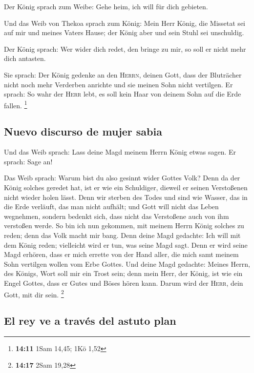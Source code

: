  Der König sprach zum Weibe: Gehe heim, ich will für dich
gebieten.

 Und das Weib von Thekoa sprach zum König: Mein Herr
König, die Missetat sei auf mir und meines Vaters Hause; der König aber
und sein Stuhl sei unschuldig.

 Der König sprach: Wer wider dich redet, den bringe zu
mir, so soll er nicht mehr dich antasten.

 Sie sprach: Der König gedenke an den \textsc{Herrn},
deinen Gott, dass der Bluträcher nicht noch mehr Verderben anrichte und
sie meinen Sohn nicht vertilgen. Er sprach: So wahr der \textsc{Herr}
lebt, es soll kein Haar von deinem Sohn auf die Erde fallen. \footnote{\textbf{14:11}
  1Sam 14,45; 1Kö 1,52}

\hypertarget{nuevo-discurso-de-mujer-sabia}{%
\subsection{Nuevo discurso de mujer
sabia}\label{nuevo-discurso-de-mujer-sabia}}

 Und das Weib sprach: Lass deine Magd meinem Herrn König
etwas sagen. Er sprach: Sage an!

 Das Weib sprach: Warum bist du also gesinnt wider Gottes
Volk? Denn da der König solches geredet hat, ist er wie ein Schuldiger,
dieweil er seinen Verstoßenen nicht wieder holen lässt. 
Denn wir sterben des Todes und sind wie Wasser, das in die Erde
verläuft, das man nicht aufhält; und Gott will nicht das Leben
wegnehmen, sondern bedenkt sich, dass nicht das Verstoßene auch von ihm
verstoßen werde.  So bin ich nun gekommen, mit meinem
Herrn König solches zu reden; denn das Volk macht mir bang. Denn deine
Magd gedachte: Ich will mit dem König reden; vielleicht wird er tun, was
seine Magd sagt.  Denn er wird seine Magd erhören, dass
er mich errette von der Hand aller, die mich samt meinem Sohn vertilgen
wollen vom Erbe Gottes.  Und deine Magd gedachte: Meines
Herrn, des Königs, Wort soll mir ein Trost sein; denn mein Herr, der
König, ist wie ein Engel Gottes, dass er Gutes und Böses hören kann.
Darum wird der \textsc{Herr}, dein Gott, mit dir sein. \footnote{\textbf{14:17}
  2Sam 19,28}

\hypertarget{el-rey-ve-a-travuxe9s-del-astuto-plan}{%
\subsection{El rey ve a través del astuto
plan}\label{el-rey-ve-a-travuxe9s-del-astuto-plan}}

